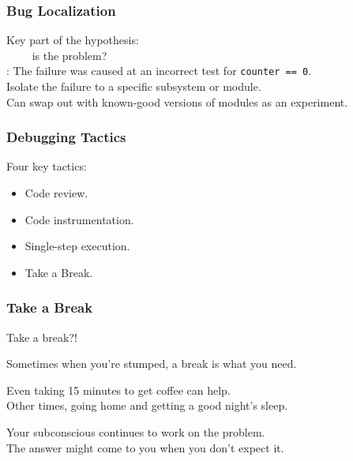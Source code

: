 \begin{frame}
\frametitle{Bug Localization}

\begin{changemargin}{1cm}

\Large
Key part of the hypothesis: \\
~~~~ is the problem?\\[1em]

\large
{}: The failure was caused at an incorrect 
test for {\tt counter == 0}.\\[1em]

\Large
Isolate the failure to
a specific subsystem or module.\\[1em]

Can swap out with known-good versions of modules as an experiment.

\end{changemargin}

\end{frame}

\begin{frame}
\frametitle{Debugging Tactics}

\begin{changemargin}{1cm}
\Large
Four key tactics:
\begin{itemize}
\item Code review.
\item Code instrumentation.
\item Single-step execution.
\item Take a Break.
\end{itemize}

\end{changemargin}

\end{frame}

\begin{frame}
\frametitle{Take a Break}

\begin{changemargin}{1cm}


Take a break?!

Sometimes when you're stumped, a break is what you need.

Even taking 15 minutes to get coffee can help.\\
\quad Other times, going home and getting a good night's sleep.


Your subconscious continues to work on the problem.\\
\quad The answer might come to you when you don't expect it.


\end{changemargin}

\end{frame}

